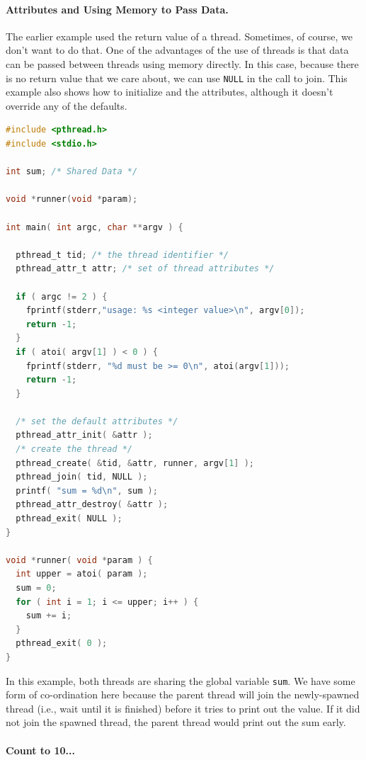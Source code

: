 \paragraph{Attributes and Using Memory to Pass Data.}
The earlier example used the return value of a thread. Sometimes, of course, we don't want to do that. One of the advantages of the use of threads is that data can be passed between threads using memory directly. In this case, because there is no return value that we care about, we can use \texttt{NULL} in the call to join. This example also shows how to initialize and the attributes, although it doesn't override any of the defaults.


\begin{lstlisting}[language=C]
#include <pthread.h>
#include <stdio.h>

int sum; /* Shared Data */

void *runner(void *param);

int main( int argc, char **argv ) {

  pthread_t tid; /* the thread identifier */
  pthread_attr_t attr; /* set of thread attributes */

  if ( argc != 2 ) {
    fprintf(stderr,"usage: %s <integer value>\n", argv[0]);
    return -1;
  }
  if ( atoi( argv[1] ) < 0 ) {
    fprintf(stderr, "%d must be >= 0\n", atoi(argv[1]));
    return -1;
  }

  /* set the default attributes */
  pthread_attr_init( &attr );
  /* create the thread */
  pthread_create( &tid, &attr, runner, argv[1] );
  pthread_join( tid, NULL );
  printf( "sum = %d\n", sum );
  pthread_attr_destroy( &attr );
  pthread_exit( NULL );
}

void *runner( void *param ) {
  int upper = atoi( param );
  sum = 0;
  for ( int i = 1; i <= upper; i++ ) {
    sum += i;
  }
  pthread_exit( 0 );
}
\end{lstlisting}

In this example, both threads are sharing the global variable \texttt{sum}. We have some form of co-ordination here because the parent thread will join the newly-spawned thread (i.e., wait until it is finished) before it tries to print out the value. If it did not join the spawned thread, the parent thread would print out the sum early.



\paragraph{Count to 10...}

